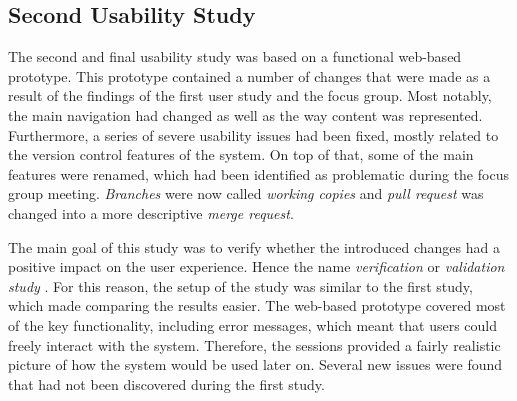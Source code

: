 
\subsection{Second Usability Study}
The second and final usability study was based on a functional web-based prototype. This prototype contained a number of changes that were made as a result of the findings of the first user study and the focus group. Most notably, the main navigation had changed as well as the way content was represented. Furthermore, a series of severe usability issues had been fixed, mostly related to the version control features of the system. On top of that, some of the main features were renamed, which had been identified as problematic during the focus group meeting. \textit{Branches} were now called \textit{working copies} and \textit{pull request} was changed into a more descriptive \textit{merge request}.

The main goal of this study was to verify whether the introduced changes had a positive impact on the user experience. Hence the name \textit{verification} or \textit{validation study} \cite{goodman_observing_2012,rubin_handbook_2008}.
For this reason, the setup of the study was similar to the first study, which made comparing the results easier. The web-based prototype covered most of the key functionality, including error messages, which meant that users could freely interact with the system. Therefore, the sessions provided a fairly realistic picture of how the system would be used later on. Several new issues were found that had not been discovered during the first study.

